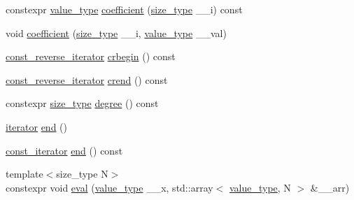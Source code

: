 \begin{DoxyCompactItemize}
\item 
constexpr \hyperlink{class____gnu__cxx_1_1__StaticPolynomial_af23110f5a002cd6caa3542df7cf35284}{value\+\_\+type} \hyperlink{class____gnu__cxx_1_1__StaticPolynomial_a412fc570171031ff0f45db048dfda225}{coefficient} (\hyperlink{class____gnu__cxx_1_1__StaticPolynomial_a3384ce6a956ad398fc995e6ee53b2b18}{size\+\_\+type} \+\_\+\+\_\+i) const
\item 
void \hyperlink{class____gnu__cxx_1_1__StaticPolynomial_a288f2c23e789bd68071223c091b5dae1}{coefficient} (\hyperlink{class____gnu__cxx_1_1__StaticPolynomial_a3384ce6a956ad398fc995e6ee53b2b18}{size\+\_\+type} \+\_\+\+\_\+i, \hyperlink{class____gnu__cxx_1_1__StaticPolynomial_af23110f5a002cd6caa3542df7cf35284}{value\+\_\+type} \+\_\+\+\_\+val)
\item 
\hyperlink{class____gnu__cxx_1_1__StaticPolynomial_a03b96649dc974fc6829342659325b7cb}{const\+\_\+reverse\+\_\+iterator} \hyperlink{class____gnu__cxx_1_1__StaticPolynomial_a19051b9e3bdb60c9ec90f5c3db7ba958}{crbegin} () const
\item 
\hyperlink{class____gnu__cxx_1_1__StaticPolynomial_a03b96649dc974fc6829342659325b7cb}{const\+\_\+reverse\+\_\+iterator} \hyperlink{class____gnu__cxx_1_1__StaticPolynomial_a45090c24cf0cf08e0a7c311fc0609a52}{crend} () const
\item 
constexpr \hyperlink{class____gnu__cxx_1_1__StaticPolynomial_a3384ce6a956ad398fc995e6ee53b2b18}{size\+\_\+type} \hyperlink{class____gnu__cxx_1_1__StaticPolynomial_a56b1719601ce049e6dd768e10edfd171}{degree} () const
\item 
\hyperlink{class____gnu__cxx_1_1__StaticPolynomial_ac52661d1503c79a7c5c90426cd0ac41e}{iterator} \hyperlink{class____gnu__cxx_1_1__StaticPolynomial_a1a6609525fd6acb2d277d32f6999d925}{end} ()
\item 
\hyperlink{class____gnu__cxx_1_1__StaticPolynomial_a6fac29559236e7576f7e35b03d35ee08}{const\+\_\+iterator} \hyperlink{class____gnu__cxx_1_1__StaticPolynomial_af163a1465847135b8f90125b8cde728d}{end} () const
\item 
{\footnotesize template$<$size\+\_\+type N$>$ }\\constexpr void \hyperlink{class____gnu__cxx_1_1__StaticPolynomial_a724e1d4553a8f93137bb93b9cae2e5f1}{eval} (\hyperlink{class____gnu__cxx_1_1__StaticPolynomial_af23110f5a002cd6caa3542df7cf35284}{value\+\_\+type} \+\_\+\+\_\+x, std\+::array$<$ \hyperlink{class____gnu__cxx_1_1__StaticPolynomial_af23110f5a002cd6caa3542df7cf35284}{value\+\_\+type}, N $>$ \&\+\_\+\+\_\+arr)
\item 

\end{DoxyCompactItemize}
